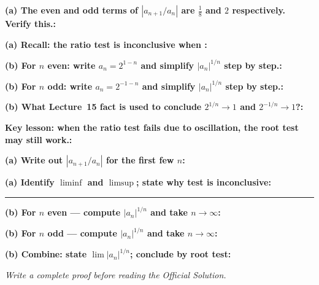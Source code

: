 \documentclass[12pt]{article}
\newcommand{\fillfield}[1]{%
  \par\noindent\textbf{#1:}\enspace\hrulefill\par\vspace{3pt}%
}
\newcommand{\writespace}[1]{\vspace{#1}}
\begin{document}
\bigskip

\begin{tcolorbox}[
  enhanced, breakable,
  colback  = pass3orange,
  colframe = orange!65!black,
  fonttitle = \bfseries,
  title = {Pass 3 \enspace\textbf{--}\enspace Self-Explanation}
]
\fillfield{(a) The even and odd terms of $|a_{n+1}/a_n|$ are $\frac{1}{8}$ and $2$ respectively. Verify this.}
\fillfield{(a) Recall: the ratio test is inconclusive when \dotfill}
\fillfield{(b) For $n$ even: write $a_n = 2^{1-n}$ and simplify $|a_n|^{1/n}$ step by step.}
\fillfield{(b) For $n$ odd: write $a_n = 2^{-1-n}$ and simplify $|a_n|^{1/n}$ step by step.}
\fillfield{(b) What Lecture~15 fact is used to conclude $2^{1/n} \to 1$ and $2^{-1/n} \to 1$?}
\fillfield{Key lesson: when the ratio test fails due to oscillation, the root test may still work.}
\end{tcolorbox}

\newpage

\begin{tcolorbox}[
  enhanced, breakable,
  colback  = pass4purple,
  colframe = purple!55!black,
  fonttitle = \bfseries,
  title = {Pass 4 \enspace\textbf{--}\enspace Skeleton Proof}
]
\noindent\textbf{(a) Write out $|a_{n+1}/a_n|$ for the first few $n$:}\par
\writespace{1.4cm}
\noindent\textbf{(a) Identify $\liminf$ and $\limsup$; state why test is inconclusive:}\par
\writespace{1.4cm}

\noindent\rule{\linewidth}{0.4pt}\vspace{2pt}

\noindent\textbf{(b) For $n$ even — compute $|a_n|^{1/n}$ and take $n\to\infty$:}\par
\writespace{1.6cm}
\noindent\textbf{(b) For $n$ odd — compute $|a_n|^{1/n}$ and take $n\to\infty$:}\par
\writespace{1.6cm}
\noindent\textbf{(b) Combine: state $\lim|a_n|^{1/n}$; conclude by root test:}\par
\writespace{1.2cm}
\end{tcolorbox}

\newpage

\begin{tcolorbox}[
  enhanced, breakable,
  colback  = pass5gray,
  colframe = black!38,
  fonttitle = \bfseries,
  title = {Pass 5 \enspace\textbf{--}\enspace Full Proof Attempt}
]
\small\itshape Write a complete proof before reading the Official Solution.\par
\normalfont\normalsize
\writespace{19cm}
\end{tcolorbox}
\end{document}
